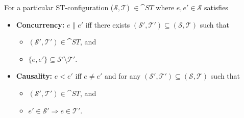     \begin{definition}
        \label{def:ST concurrency and causality}
        For a particular ST-configuration ($\mathcal{S},\mathcal{T}$) $\in \cat{ST}$ where $e, e' \in \mathcal{S}$ satisfies
        
        \begin{itemize}
            \item \textbf{Concurrency:} $e \parallel e'$ iff there exists $(\mathcal{S}',\mathcal{T}') \subseteq (\mathcal{S},\mathcal{T})$ such that
            \begin{itemize}
                \item $(\mathcal{S}',\mathcal{T}') \in \cat{ST}$, and
                \item $\{e,e'\} \subseteq \mathcal{S}' \setminus \mathcal{T}'$.
            \end{itemize}
            \item \textbf{Causality:} $e < e'$ iff $e \neq e'$ and for any $(\mathcal{S}',\mathcal{T}') \subseteq (\mathcal{S},\mathcal{T})$ such that
            \begin{itemize}
                \item $(\mathcal{S}',\mathcal{T}') \in \cat{ST}$, and
                \item $e' \in \mathcal{S}' \Rightarrow e \in \mathcal{T}'$.
            \end{itemize}
        \end{itemize}
        
        
        
        
    \end{definition}
    
